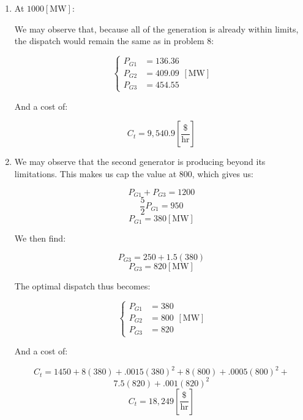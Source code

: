 \begin{enumerate}
\begin{enumerate}
      \item At $1000[\si{\mega\watt}]$:

        We may observe that, because all of the generation is already within limits, the dispatch would remain the same as in problem 8:

        $$\boxed{\left\{\begin{array}{ll} P_{G1}&= 136.36\\P_{G2}&= 409.09\\P_{G3}&= 454.55\end{array}[\si{\mega\watt}]}$$

        And a cost of:

        $$\boxed{C_t=9,540.9\left[ \frac{\$}{\text{hr}} \right]}$$

      \item We may observe that the second generator is producing beyond its limitations. This makes us cap the value at 800, which gives us:

        $$P_{G1}+P_{G3}=1200$$
        $$\frac{5}{2}P_{G1}=950$$
        $$\boxed{P_{G1}=380[\si{\mega\watt}]}$$

        We then find:

        $$P_{G3}=250+1.5(380)$$
        $$\boxed{P_{G3}=820[\si{\mega\watt}]}$$

        The optimal dispatch thus becomes:

        $$\boxed{\left\{\begin{array}{ll} P_{G1}&= 380\\P_{G2}&= 800\\P_{G3}&= 820\end{array}[\si{\mega\watt}]}$$

        And a cost of:

        $$C_t=1450+8(380)+.0015(380)^2+8(800)+.0005(800)^2+$$
        $$7.5(820)+.001(820)^2$$
        $$\boxed{C_t=18,249\left[ \frac{\$}{\text{hr}} \right]}$$

    \end{enumerate}

\end{enumerate}



